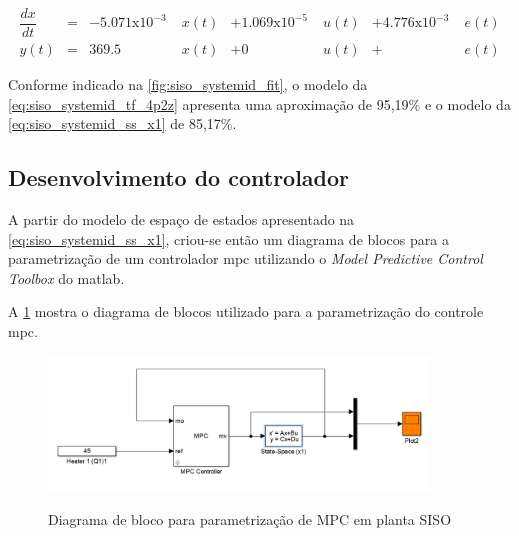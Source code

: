 \begin{equation}
    \label{eq:siso_systemid_ss_x1}
    \begin{aligned}
        \dfrac{dx}{dt} &= & -5.071 \mathrm{x10^{-3}}\; &x(t) & + 1.069 \mathrm{x10^{-5}}\; &u(t) & + 4.776 \mathrm{x10^{-3}}\; &e(t) \\
        y(t) &= & 369.5\; &x(t) & + 0\; &u(t) & + &e(t)
    \end{aligned}
\end{equation}
\newline

Conforme indicado na \cref{fig:siso_systemid_fit}, o modelo da \cref{eq:siso_systemid_tf_4p2z} apresenta uma
aproximação de 95,19\% e o modelo da \cref{eq:siso_systemid_ss_x1} de 85,17\%.

\subsection{Desenvolvimento do controlador}
\label{subsec:siso_desenvolvimento_do_controlador}

A partir do modelo de espaço de estados apresentado na \cref{eq:siso_systemid_ss_x1}, criou-se então
um diagrama de blocos para a parametrização de um controlador \acrshort{mpc} utilizando o
\textit{Model Predictive Control Toolbox} do \acrshort{matlab}.

A \cref{fig:siso_simulink_ss} mostra o diagrama de blocos utilizado para a parametrização do controle
\acrshort{mpc}.

\begin{figure}
    \caption{Diagrama de bloco para parametrização de MPC em planta SISO}
	\begin{center}
		\includegraphics[width=0.9\textwidth]{./5_images/Exp_303_Simulink_SS.png} 
		\label{fig:siso_simulink_ss}
	\end{center}
    \centering
\end{figure}

